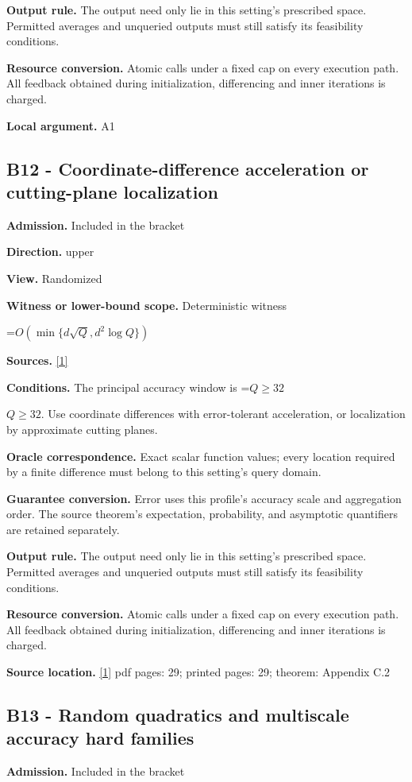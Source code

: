 \documentclass[10pt,a4paper]{article}
\newcommand{\AtlasMath}[1]{\par\begingroup\centering\setbox0=\hbox{$\displaystyle #1$}\ifdim\wd0>1.4\linewidth\typeout{ATLAS WIDE FORMULA: \the\wd0}\fi\ifdim\wd0>\linewidth\resizebox{\linewidth}{!}{\box0}\else\box0\fi\par\endgroup}
\newcommand{\AtlasInlineMath}[1]{\begingroup\setbox0=\hbox{$#1$}\ifdim\wd0>.4\linewidth\endgroup\AtlasMath{#1}\else\endgroup$#1$\fi}
\begin{document}
\textbf{Output rule.} The output need only lie in this setting's prescribed space. Permitted averages and unqueried outputs must still satisfy its feasibility conditions.

\textbf{Resource conversion.} Atomic calls under a fixed cap on every execution path. All feedback obtained during initialization, differencing and inner iterations is charged.

\textbf{Local argument.} A1

\subsection{B12 - Coordinate-difference acceleration or cutting-plane localization}
\textbf{Admission.} Included in the bracket

\textbf{Direction.} upper

\textbf{View.} Randomized

\textbf{Witness or lower-bound scope.} Deterministic witness

\AtlasMath{O\!\left(\min\{d\sqrt Q,d^2\log Q\}\right)}
\textbf{Sources.} \href{https://arxiv.org/html/2610.00345v1}{[1]}

\textbf{Conditions.} The principal accuracy window is \AtlasInlineMath{Q\ge32}. Use coordinate differences with error-tolerant acceleration, or localization by approximate cutting planes.

\textbf{Oracle correspondence.} Exact scalar function values; every location required by a finite difference must belong to this setting's query domain.

\textbf{Guarantee conversion.} Error uses this profile's accuracy scale and aggregation order. The source theorem's expectation, probability, and asymptotic quantifiers are retained separately.

\textbf{Output rule.} The output need only lie in this setting's prescribed space. Permitted averages and unqueried outputs must still satisfy its feasibility conditions.

\textbf{Resource conversion.} Atomic calls under a fixed cap on every execution path. All feedback obtained during initialization, differencing and inner iterations is charged.

\textbf{Source location.} \href{https://arxiv.org/html/2610.00345v1}{[1]} pdf pages: 29; printed pages: 29; theorem: Appendix C.2

\subsection{B13 - Random quadratics and multiscale accuracy hard families}
\textbf{Admission.} Included in the bracket
\end{document}
